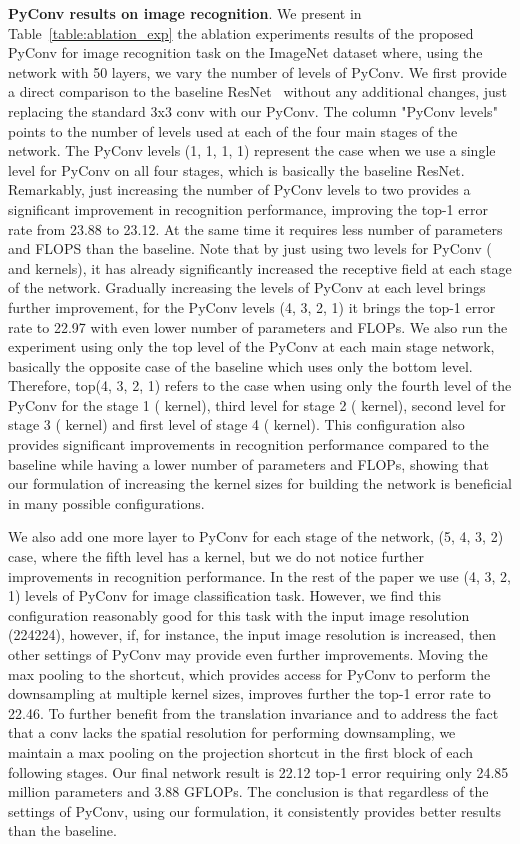 \documentclass{article}
\begin{document}
\textbf{PyConv results on image recognition}. We present in  Table~\ref{table:ablation_exp}  the ablation experiments results of the proposed PyConv for image recognition task on the ImageNet dataset where, using the network with 50 layers, we vary the number of levels of PyConv. We first provide a direct comparison  to the baseline ResNet~\cite{he2016deep} without any additional changes, just replacing the standard 3x3 conv with our PyConv.   The column "PyConv levels" points to the number of levels used at each of the four main stages of the network. The PyConv levels (1, 1, 1, 1) represent the case when we use a single level for PyConv on all four stages, which is basically the baseline ResNet. Remarkably, just increasing the number of PyConv levels to two  provides a significant improvement in recognition performance, improving the top-1 error rate from 23.88 to 23.12. At the same time it requires less number of parameters and FLOPS than the baseline. Note that by just using two levels for PyConv ( and  kernels), it has already significantly increased the receptive field at each stage of the network. Gradually increasing the levels of PyConv at each level brings further improvement, for the PyConv levels (4, 3, 2, 1) it brings the top-1 error rate to 22.97 with even lower number of parameters and FLOPs. We also run the experiment using only the top level of the PyConv at each main stage network, basically the opposite case of the baseline which uses only the bottom level. Therefore, top(4, 3, 2, 1) refers to the case when using only the fourth level of the PyConv for the stage 1 ( kernel), third level for stage 2 ( kernel), second level for stage 3  ( kernel) and first level of stage 4 ( kernel). This configuration also provides significant improvements in recognition performance compared to the baseline while having a lower number of parameters and FLOPs, showing that our formulation of increasing the kernel sizes for building the network is beneficial in many possible configurations.


We also add one more layer to PyConv for each stage of the network, (5, 4, 3, 2) case, where the fifth level has a  kernel, but we do not notice further improvements in recognition performance. In the rest of the paper we use (4, 3, 2, 1) levels of PyConv for image classification task. However, we find  this configuration reasonably good for this task with the input image resolution (224224), however, if, for instance, the input image resolution is increased, then other settings of PyConv may provide even further improvements.  Moving the max pooling to the shortcut, which provides access for PyConv to perform the downsampling at multiple kernel sizes, improves further the  top-1 error rate to 22.46. To further benefit from the translation invariance and to address the fact that a  conv lacks the spatial resolution for performing downsampling, we maintain a max pooling on the projection shortcut in the first block of each following stages. Our final network result is 22.12 top-1 error requiring only 24.85 million parameters and 3.88 {\small GFLOPs}. 
The conclusion is that regardless of the settings of PyConv, using our formulation, it consistently provides better results than the baseline.
\end{document}
